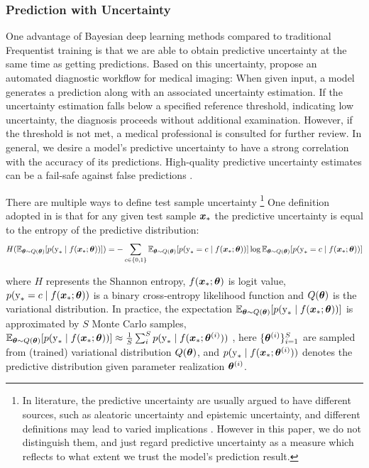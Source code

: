 \documentclass[10pt]{article} %
\begin{document}
\subsubsection{Prediction with Uncertainty}
One advantage of Bayesian deep learning methods compared to traditional Frequentist training is that we are able to obtain predictive uncertainty at the same time as getting predictions. Based on this uncertainty, \citet{band2022benchmarking} propose an automated diagnostic workflow for medical imaging: When given input, a model generates a prediction along with an associated uncertainty estimation. If the uncertainty estimation falls below a specified reference threshold, indicating low uncertainty, the diagnosis proceeds without additional examination. However, if the threshold is not met, a medical professional is consulted for further review. In general, we desire a model's predictive uncertainty to have a strong correlation with the accuracy of its predictions. High-quality predictive uncertainty estimates can be a fail-safe against false predictions 
\citep{band2022benchmarking}. 

There are multiple ways to define test sample uncertainty \footnote{In literature, the predictive uncertainty are usually argued to have different sources, such as aleatoric uncertainty and epistemic uncertainty, and different definitions may lead to varied implications \citep{ulmer2023prior, d2021repulsive}. However in this paper, we do not distinguish them, and just regard predictive uncertainty as a measure which reflects to what extent we trust the model's prediction result.} One definition adopted in \citet{band2022benchmarking} is that for any given test sample ${\bm{x}}_*$ the predictive uncertainty is equal to the entropy of the predictive distribution: 
\begin{equation}
H(\mathbb{E}_{{\bm{\theta}} \sim Q({\bm{\theta}})}[p({\textnormal{y}}_* \mid f({\bm{x}}_* ; {\bm{\theta}}))])=-\sum_{c \in\{0,1\}} \mathbb{E}_{{\bm{\theta}} \sim Q({\bm{\theta}})}[p({\textnormal{y}}_*=c \mid f({\bm{x}}_* ; {\bm{\theta}}))] \log \mathbb{E}_{{\bm{\theta}} \sim Q({\bm{\theta}})} [p({\textnormal{y}}_*=c \mid f({\bm{x}}_* ; {\bm{\theta}}))]
\end{equation}

where $H$ represents the Shannon entropy, $f({\bm{x}}_*;{\bm{\theta}})$ is logit value, $p({\textnormal{y}}_*=c \mid f({\bm{x}}_* ; {\bm{\theta}}))$ is a binary cross-entropy likelihood function and $Q({\bm{\theta}})$ is the variational distribution. In practice, the expectation $\mathbb{E}_{{\bm{\theta}} \sim Q({\bm{\theta}})}[p({\textnormal{y}}_* \mid f({\bm{x}}_* ; {\bm{\theta}}))]$ is approximated by $S$ Monte Carlo samples,
$\mathbb{E}_{{\bm{\theta}} \sim Q({\bm{\theta}})}[p({\textnormal{y}}_* \mid f({\bm{x}}_* ; {\bm{\theta}}))] \approx \frac{1}{S} \sum_i^S p({\textnormal{y}}_* \mid f({\bm{x}}_* ; {\bm{\theta}}^{(i)}))$ , here $\{{\bm{\theta}}^{(i)}\}_{i=1}^S$ are sampled from (trained) variational distribution $Q({\bm{\theta}})$, and $p({\textnormal{y}}_* \mid f({\bm{x}}_* ; {\bm{\theta}}^{(i)}))$ denotes the predictive distribution given parameter realization ${\bm{\theta}}^{\left(i\right)}$.
\end{document}

